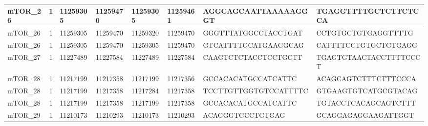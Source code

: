 \begin{landscape}
\begin{longtable}{| p{} | p{} | p{} | p{} | p{} | p{} | p{} | p{} |}
\multicolumn{1}{|l|}{mTOR\_26}   & \multicolumn{1}{c|}{1}  & \multicolumn{1}{l|}{11259305}  & \multicolumn{1}{l|}{11259470}  & \multicolumn{1}{l|}{11259305}  & \multicolumn{1}{l|}{11259461}  & \multicolumn{1}{l|}{AGGCAGCAATTAAAAAGGGT}            & \multicolumn{1}{l|}{TGAGGTTTTGCTCTTCTCCA}          \\ \hline
\multicolumn{1}{|l|}{mTOR\_26}   & \multicolumn{1}{c|}{1}  & \multicolumn{1}{l|}{11259305}  & \multicolumn{1}{l|}{11259470}  & \multicolumn{1}{l|}{11259320}  & \multicolumn{1}{l|}{11259470}  & \multicolumn{1}{l|}{GGGTTTATGGCCTACCTGAT}            & \multicolumn{1}{l|}{CCTGTGCTGTGAGGTTTTG}           \\ \hline
\multicolumn{1}{|l|}{mTOR\_26}   & \multicolumn{1}{c|}{1}  & \multicolumn{1}{l|}{11259305}  & \multicolumn{1}{l|}{11259470}  & \multicolumn{1}{l|}{11259305}  & \multicolumn{1}{l|}{11259470}  & \multicolumn{1}{l|}{GTCATTTTGCATGAAGGCAG}            & \multicolumn{1}{l|}{CATTTTCCTGTGCTGTGAGG}          \\ \hline
\multicolumn{1}{|l|}{mTOR\_27}   & \multicolumn{1}{c|}{1}  & \multicolumn{1}{l|}{11227489}  & \multicolumn{1}{l|}{11227584}  & \multicolumn{1}{l|}{11227489}  & \multicolumn{1}{l|}{11227584}  & \multicolumn{1}{l|}{CAAGTCTCTACCTCCTGCTT}            & \multicolumn{1}{l|}{TGAGTGTAACTACCTTTTCCCT}        \\ \hline
\multicolumn{1}{|l|}{mTOR\_28}   & \multicolumn{1}{c|}{1}  & \multicolumn{1}{l|}{11217199}  & \multicolumn{1}{l|}{11217358}  & \multicolumn{1}{l|}{11217199}  & \multicolumn{1}{l|}{11217356}  & \multicolumn{1}{l|}{GCCACACATGCCATCATTC}             & \multicolumn{1}{l|}{ACAGCAGTCTTTCTTTCCCA}          \\ \hline
\multicolumn{1}{|l|}{mTOR\_28}   & \multicolumn{1}{c|}{1}  & \multicolumn{1}{l|}{11217199}  & \multicolumn{1}{l|}{11217358}  & \multicolumn{1}{l|}{11217284}  & \multicolumn{1}{l|}{11217358}  & \multicolumn{1}{l|}{TCCTTGTTGGTGTCCATTTTC}           & \multicolumn{1}{l|}{GTGAAGTGTCATGCGTACAG}          \\ \hline
\multicolumn{1}{|l|}{mTOR\_28}   & \multicolumn{1}{c|}{1}  & \multicolumn{1}{l|}{11217199}  & \multicolumn{1}{l|}{11217358}  & \multicolumn{1}{l|}{11217199}  & \multicolumn{1}{l|}{11217358}  & \multicolumn{1}{l|}{GCCACACATGCCATCATTC}             & \multicolumn{1}{l|}{TGTACCTCACAGCAGTCTTT}          \\ \hline
\multicolumn{1}{|l|}{mTOR\_29}   & \multicolumn{1}{c|}{1}  & \multicolumn{1}{l|}{11210173}  & \multicolumn{1}{l|}{11210293}  & \multicolumn{1}{l|}{11210173}  & \multicolumn{1}{l|}{11210293}  & \multicolumn{1}{l|}{ACAGGGTGCCTGTGAG}                & \multicolumn{1}{l|}{GCAGGAGAGGAAGATTGGT}           \\ \hline

\end{longtable}
\end{landscape}
